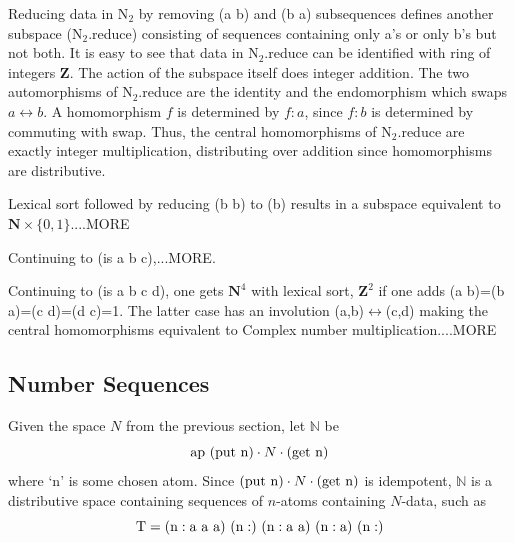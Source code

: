\documentclass[11pt]{article}
\begin{document}
\begin{itemize}
{}
\item{Reducing data in N$_2$ by removing (a b) and (b a) subsequences defines another subspace (N$_2$.reduce) consisting of 
sequences containing only a's or only b's but not both.  It is easy to see that data in N$_2$.reduce can be identified with 
ring of integers $\mathbf Z$.  The action of the subspace itself does integer addition.  
The two automorphisms of N$_2$.reduce are the identity and the endomorphism which 
swaps $a\leftrightarrow b$.  A homomorphism $f$ is determined by $f:a$, since $f:b$ is determined by commuting with swap. 
Thus, the central homomorphisms of N$_2$.reduce are exactly integer multiplication, distributing over addition since homomorphisms are 
distributive.  

\item{Lexical sort followed by reducing (b b) to (b) results in a subspace equivalent to $\mathbf N\times\{0,1\}$....MORE}

} 
\end{itemize}

    Continuing to (is a b c),...MORE.

    Continuing to (is a b c d), one gets $\mathbf N^4$ with lexical sort, $\mathbf Z^2$ if one adds (a b)=(b a)=(c d)=(d c)=1.  The latter 
case has an involution (a,b)$\leftrightarrow$(c,d) making the central homomorphisms equivalent to Complex number multiplication....MORE 

\subsection{Number Sequences}

      Given the space $N$ from the previous section, let $\mathbb{N}$ be 
\begin{equation}
{{\rm ap}\ ({\rm put\ {\rm n}})\cdot N \cdot ({\rm get\ {\rm n}})}
\end{equation}
where `n' is some chosen atom.  Since $({\rm put\ n})\cdot N \cdot ({\rm get\ n})$ is idempotent, ${\mathbb N}$ is a distributive space containing 
sequences of $n$-atoms containing $N$-data, such as 
\begin{equation} 
{\rm T = (n:a\ a\ a)\ (n:)\ (n:a\ a)\ (n:a)\ (n:)}
\end{equation} 
\end{document}
